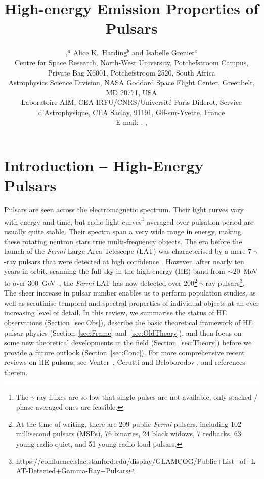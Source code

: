 \documentclass{PoS}
\title{High-energy Emission Properties of Pulsars}
\author{\speaker{Christo Venter},$^a$ Alice K.\ Harding$^{b}$
and Isabelle Grenier$^{c}$\\
\llap{$^a$}Centre for Space Research, North-West University, Potchefstroom Campus, Private Bag X6001, Potchefstroom 2520, South Africa\\
\llap{$^b$}Astrophysics Science Division, NASA Goddard Space Flight Center, Greenbelt, MD 20771, USA\\
\llap{$^c$}Laboratoire AIM, CEA-IRFU/CNRS/Universit\'e Paris Diderot, Service d'Astrophysique, CEA Saclay, 91191, Gif-sur-Yvette, France\\
E-mail: \email{Christo.Venter@nwu.ac.za}, \email{ahardingx@yahoo.com}, \email{isabelle.grenier@cea.fr}}
\begin{document}
\section{Introduction -- High-Energy Pulsars}
Pulsars are seen across the electromagnetic spectrum. Their light curves vary with energy and time, but radio light curves\footnote{The $\gamma$-ray fluxes are so low that single pulses are not available, only stacked / phase-averaged ones are feasible.} averaged over pulsation period are usually quite stable. Their spectra span a very wide range in energy, making these rotating neutron stars true multi-frequency objects. The era before the launch of the \textit{Fermi} Large Area Telescope (LAT) was characterised by a mere 7 $\gamma$-ray pulsars that were detected at high confidence \cite{Thompson2004}. However, after nearly ten years in orbit, scanning the full sky in the high-energy (HE) band from $\sim20$~MeV to over 300~GeV~\cite{Atwood2009}, the \textit{Fermi} LAT has now detected over 200\footnote{At the time of writing, there are 209 public \textit{Fermi} pulsars, including 102 millisecond pulsars (MSPs), 76 binaries, 24 black widows, 7 redbacks, 63 young radio-quiet, and 51 young radio-loud pulsars.} $\gamma$-ray pulsars\footnote{https://confluence.slac.stanford.edu/display/GLAMCOG/Public+List+of+LAT-Detected+Gamma-Ray+Pulsars}. The sheer increase in pulsar number enables us to perform population studies, as well as scrutinise temporal and spectral properties of individual objects at an ever increasing level of detail. In this review, we summarise the status of HE observations (Section~\ref{sec:Obs}), describe the basic theoretical framework of HE pulsar physics (Section~\ref{sec:Frame} and~\ref{sec:OldTheory}), and then focus on some new theoretical developments in the field (Section~\ref{sec:Theory}) before we provide a future outlook (Section~\ref{sec:Conc}). For more comprehensive recent reviews on HE pulsars, see Venter~\cite{Venter16_HEASA}, Cerutti and Beloborodov \cite{Cerutti17a}, and references therein. 
\end{document}
